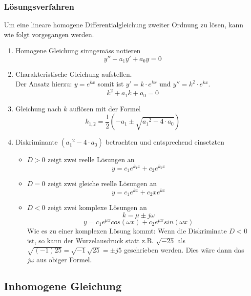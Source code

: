 \subsubsection{Lösungsverfahren}
Um eine lineare homogene Differentialgleichung zweiter Ordnung zu 
lösen, kann wie folgt vorgegangen werden.
\begin{enumerate}
  \item Homogene Gleichung sinngemäss notieren
	\[ y'' + a_1y' + a_0y = 0 \]
  \item Charakteristische Gleichung aufstellen.\\
	Der Ansatz hierzu: $y=e^{kx}$ somit ist $y'=k\cdot e^{kx}$
	und $y''=k^2 \cdot e^{kx}$.
	\[ k^2 + a_1k + a_0 = 0 \]
  \item Gleichung nach $k$ auflösen mit der Formel
	\[ k_{1,2} = \frac{1}{2}\left(-a_1 \pm \sqrt{{a_1}^2 - 4 \cdot a_0}\right) \]
\item Diskriminante $({a_1}^2 - 4 \cdot a_0)$ betrachten und entsprechend einsetzten
	\begin{itemize}
	  \item $D > 0$ zeigt zwei reelle Lösungen an\\
		\[ y=c_1e^{k_1x} + c_2e^{k_2x} \]
          \item $D = 0$ zeigt zwei gleiche reelle Lösungen an\\
		\[ y=c_1e^{kx} + c_2xe^{kx} \]
          \item $D < 0$ zeigt zwei komplexe Lösungen an\\
		\[ k=\mu \pm j \omega \]
		\[ y=c_1e^{\mu x} cos(\omega x) + c_2e^{\mu x} sin(\omega x) \]
		Wie es zu einer komplexen Lösung kommt: 
		Wenn die Diskriminate $D < 0$ ist, so kann der Wurzelausdruck
		statt z.B. $\sqrt{-25}$ als 
		$\sqrt{(-1)25}=\sqrt{-1}\sqrt{25}=\pm j5$ geschrieben werden.
		Dies wäre dann das $j\omega$ aus obiger Formel.
	\end{itemize}
\end{enumerate}

\subsection{Inhomogene Gleichung}

